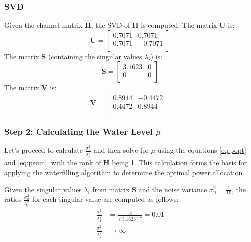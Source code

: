 \documentclass[lettersize,journal]{IEEEtran}
\begin{document}
\subsubsection{SVD}
Given the channel matrix \( \mathbf{H} \), the SVD of \( \mathbf{H} \) is computed:
The matrix \( \mathbf{U} \) is:
\begin{equation}
\mathbf{U} = \begin{bmatrix}
0.7071 & 0.7071 \\
0.7071 & -0.7071 \\
\end{bmatrix}
\end{equation}
The matrix \( \mathbf{S} \) (containing the singular values \( \lambda_i \)) is:
\begin{equation}
\mathbf{S} = \begin{bmatrix}
3.1623 & 0 \\
0 & 0 \\
\end{bmatrix}
\end{equation}
The matrix \( \mathbf{V} \) is:
\begin{equation}
\mathbf{V} = \begin{bmatrix}
0.8944 & -0.4472 \\
0.4472 & 0.8944 \\
\end{bmatrix}
\end{equation}

\subsubsection{Step 2: Calculating the Water Level \( \mu \)}
Let's proceed to calculate \( \frac{\sigma_n^2}{\lambda_i^2} \) and then solve for \( \mu \) using the equations \eqref{eq:popt} and \eqref{eq:psum}, with the rank of \( \mathbf{H} \) being 1. This calculation forms the basis for applying the waterfilling algorithm to determine the optimal power allocation.

Given the singular values \( \lambda_i \) from matrix \( \mathbf{S} \) and the noise variance \( \sigma_n^2 = \frac{1}{10} \), the ratios \( \frac{\sigma_n^2}{\lambda_i^2} \) for each singular value are computed as follows:
\begin{equation}
\begin{aligned}
\frac{\sigma_n^2}{\lambda_1^2} &= \frac{\frac{1}{10}}{(3.1623)^2} = 0.01 \\
\frac{\sigma_n^2}{\lambda_2^2} &\to \infty
\end{aligned}
\end{equation}
\end{document}
